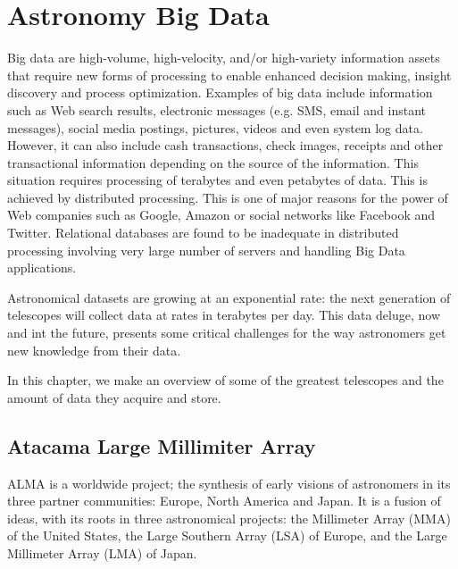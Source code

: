 \chapter{Astronomy Big Data}\label{theproblem}


Big data are high-volume, high-velocity, and/or high-variety information assets that require new forms of processing to enable enhanced decision making, insight discovery and process optimization. Examples of big data include information such as Web search results, electronic messages (e.g. SMS, email and instant messages), social media postings, pictures, videos and even system log data. However, it can also include cash transactions, check images, receipts and other transactional information depending on the source of the information. This situation requires processing of terabytes and even petabytes of data. This is achieved by distributed processing. This is one of major reasons for the power of Web companies such as
Google, Amazon or social networks like Facebook and Twitter. Relational databases are found to be inadequate in distributed processing involving very large number of servers and handling Big Data applications. \newline

Astronomical datasets are growing at an exponential rate: the next generation of telescopes will collect data at rates in terabytes per day. This data deluge, now and int the future, presents some critical challenges for the way astronomers get new knowledge from their data. \newline

In this chapter, we make an overview of some of the greatest telescopes and the amount of data they acquire and store.


\section{Atacama Large Millimiter Array}

ALMA is a worldwide project; the synthesis of early visions of astronomers in its three partner communities: Europe, North America and Japan. It is a fusion of ideas, with its roots in three astronomical projects: the Millimeter Array (MMA) of the United States, the Large Southern Array (LSA) of Europe, and the Large Millimeter Array (LMA) of Japan.



